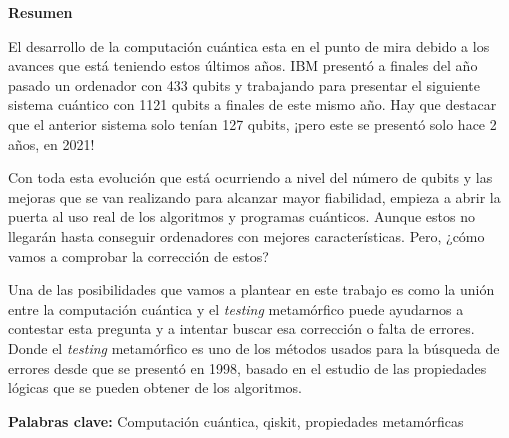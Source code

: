 \newpage

\thispagestyle{empty}

\begin{center}

{\bf \Huge Resumen}

  \end{center}
\vspace{1cm}

 El desarrollo de la computación cuántica esta en el punto de mira debido a los avances que está teniendo estos últimos años. IBM presentó a finales del año pasado un ordenador con 433 qubits y trabajando para presentar el siguiente sistema cuántico con 1121 qubits a finales de este mismo año. Hay que destacar que el anterior sistema solo tenían 127 qubits, ¡pero este se presentó solo hace 2 años, en 2021! \newline

Con toda esta evolución que está ocurriendo a nivel del número de qubits y las mejoras que se van realizando para alcanzar mayor fiabilidad, empieza a abrir la puerta al uso real de los algoritmos y programas cuánticos. Aunque estos no llegarán hasta conseguir ordenadores con mejores características. Pero, ¿cómo vamos a comprobar la corrección de estos? \newline 

Una de las posibilidades que vamos a plantear en este trabajo es como la unión entre la computación cuántica y el \textit{testing} metamórfico puede ayudarnos a contestar esta pregunta y a intentar buscar esa corrección o falta de errores. Donde el \textit{testing} metamórfico es uno de los métodos usados para la búsqueda de errores desde que se presentó en 1998, basado en el estudio de las propiedades lógicas que se pueden obtener de los algoritmos.

\vspace{1cm}



\textbf{Palabras clave:} Computación cuántica, qiskit, propiedades metamórficas
   
   
   